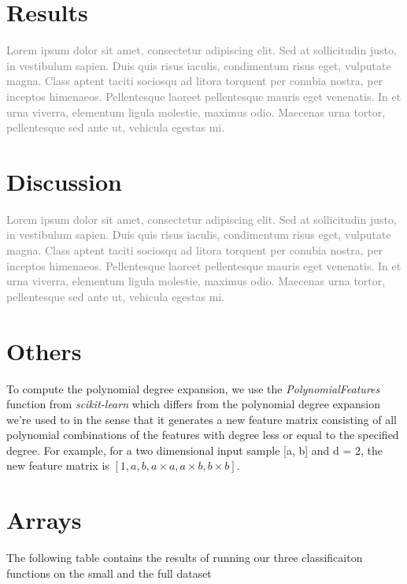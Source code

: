 \documentclass[10pt,conference,compsocconf]{IEEEtran}
\begin{document}
\section{Results}
\textcolor{gray}{Lorem ipsum dolor sit amet, consectetur adipiscing elit. Sed at sollicitudin justo, in vestibulum sapien. Duis quis risus iaculis, condimentum risus eget, vulputate magna. Class aptent taciti sociosqu ad litora torquent per conubia nostra, per inceptos himenaeos. Pellentesque laoreet pellentesque mauris eget venenatis. In et urna viverra, elementum ligula molestie, maximus odio. Maecenas urna tortor, pellentesque sed ante ut, vehicula egestas mi.}

\section{Discussion}

\textcolor{gray}{Lorem ipsum dolor sit amet, consectetur adipiscing elit. Sed at sollicitudin justo, in vestibulum sapien. Duis quis risus iaculis, condimentum risus eget, vulputate magna. Class aptent taciti sociosqu ad litora torquent per conubia nostra, per inceptos himenaeos. Pellentesque laoreet pellentesque mauris eget venenatis. In et urna viverra, elementum ligula molestie, maximus odio. Maecenas urna tortor, pellentesque sed ante ut, vehicula egestas mi.}

{\color{purple}

\section{Others}
To compute the polynomial degree expansion, we use the \textit{PolynomialFeatures} function from \textit{scikit-learn} which differs from the polynomial degree expansion we're used to in the sense that it generates a new feature matrix consisting of all polynomial combinations of the features with degree less or equal to the specified degree. For example, for a two dimensional input sample [a, b] and d = 2, the new feature matrix is $[1, a, b, a\times a, a\times b, b\times b]$.

}

\section{Arrays}




The following table contains the results of running our three classificaiton functions on the small and the full dataset
\end{document}
